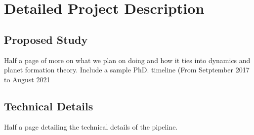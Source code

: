 \section{Detailed Project Description}
\subsection{Proposed Study}
Half a page of more on what we plan on doing and how it ties into dynamics and planet formation theory.
Include a sample PhD. timeline (From Setptember 2017 to August 2021 
\subsection{Technical Details}
Half a page detailing the technical details of the pipeline.
